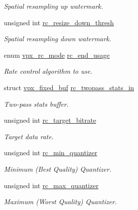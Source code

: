 \begin{DoxyCompactItemize}
\begin{DoxyCompactList}\small\item\em \-Spatial resampling up watermark. \end{DoxyCompactList}\item 
unsigned int \hyperlink{structvpx__codec__enc__cfg_a1be7bd7b0eaf1e99b5e4028c37c65488}{rc\-\_\-resize\-\_\-down\-\_\-thresh}
\begin{DoxyCompactList}\small\item\em \-Spatial resampling down watermark. \end{DoxyCompactList}\item 
enum \hyperlink{group__encoder_gaf50e74d91be4cae6f70dfeba5b7410d2}{vpx\-\_\-rc\-\_\-mode} \hyperlink{structvpx__codec__enc__cfg_a99c415edb6c6f909a095a57c3430a116}{rc\-\_\-end\-\_\-usage}
\begin{DoxyCompactList}\small\item\em \-Rate control algorithm to use. \end{DoxyCompactList}\item 
struct \hyperlink{structvpx__fixed__buf}{vpx\-\_\-fixed\-\_\-buf} \hyperlink{structvpx__codec__enc__cfg_a618616a07d9d8883c544731957b56f3c}{rc\-\_\-twopass\-\_\-stats\-\_\-in}
\begin{DoxyCompactList}\small\item\em \-Two-\/pass stats buffer. \end{DoxyCompactList}\item 
unsigned int \hyperlink{structvpx__codec__enc__cfg_ab8339685175d66710f482706cc9f0aed}{rc\-\_\-target\-\_\-bitrate}
\begin{DoxyCompactList}\small\item\em \-Target data rate. \end{DoxyCompactList}\item 
unsigned int \hyperlink{structvpx__codec__enc__cfg_a1324600e3c63faaa7717e85cf6509dd9}{rc\-\_\-min\-\_\-quantizer}
\begin{DoxyCompactList}\small\item\em \-Minimum (\-Best \-Quality) \-Quantizer. \end{DoxyCompactList}\item 
unsigned int \hyperlink{structvpx__codec__enc__cfg_a8abdd985d317b720e142335887d737df}{rc\-\_\-max\-\_\-quantizer}
\begin{DoxyCompactList}\small\item\em \-Maximum (\-Worst \-Quality) \-Quantizer. \end{DoxyCompactList}\item 

\end{DoxyCompactItemize}
